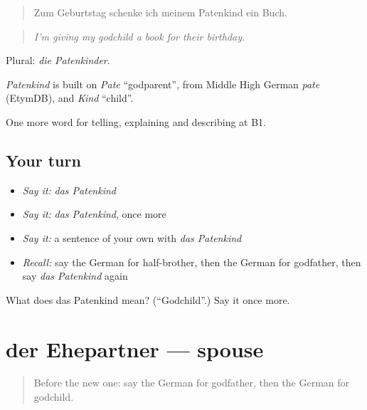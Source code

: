 \begin{quote}
Zum Geburtstag schenke ich meinem Patenkind ein Buch.
\end{quote}

\begin{quote}
\emph{I'm giving my godchild a book for their birthday.}
\end{quote}

Plural: \emph{die Patenkinder}.

\begin{cousinweb}
\emph{Patenkind} is built on \emph{Pate} \textquotedblleft{}godparent\textquotedblright{}, from Middle High German \emph{pate} (EtymDB), and \emph{Kind} \textquotedblleft{}child\textquotedblright{}.
\end{cousinweb}

\begin{grammarlens}[title={What you've built}]
One more word for telling, explaining and describing at B1.
\end{grammarlens}

\subsection*{Your turn}
\begin{itemize}
\raggedright
  \item \emph{Say it:} \emph{das Patenkind}
  \item \emph{Say it:} \emph{das Patenkind}, once more
  \item \emph{Say it:} a sentence of your own with \emph{das Patenkind}
  \item \emph{Recall:} say the German for half-brother, then the German for godfather, then say \emph{das Patenkind} again
\end{itemize}

\begin{tcolorbox}[breakable,colback=teal!4,colframe=teal!35!black,title={Before you move on}]
What does das Patenkind mean? (\textquotedblleft{}Godchild\textquotedblright{}.) Say it once more.
\end{tcolorbox}
\section[der Ehepartner]{der Ehepartner — spouse}

\label{lesson:GE-C491-ehepartner}



\begin{quote}
Before the new one: say the German for godfather, then the German for godchild.
\end{quote}

